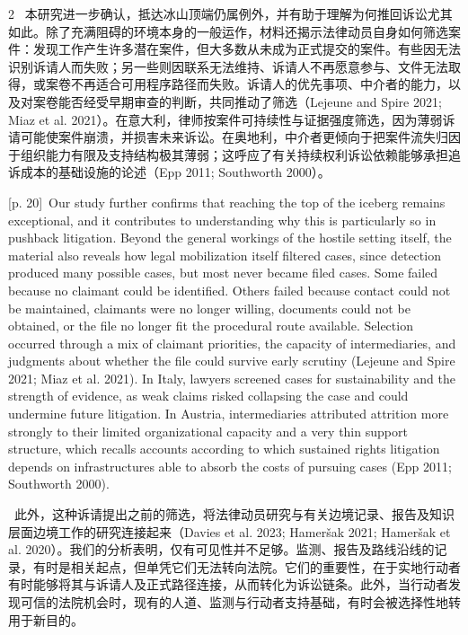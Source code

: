 \documentclass[10pt,a4paper]{article}
\begin{document}
\begin{paracol}{2}
\switchcolumn*
{\scriptsize\color{gray} [p. 20]}\ 本研究进一步确认，抵达冰山顶端仍属例外，并有助于理解为何推回诉讼尤其如此。除了充满阻碍的环境本身的一般运作，材料还揭示法律动员自身如何筛选案件：发现工作产生许多潜在案件，但大多数从未成为正式提交的案件。有些因无法识别诉请人而失败；另一些则因联系无法维持、诉请人不再愿意参与、文件无法取得，或案卷不再适合可用程序路径而失败。诉请人的优先事项、中介者的能力，以及对案卷能否经受早期审查的判断，共同推动了筛选（Lejeune and Spire 2021; Miaz et al. 2021）。在意大利，律师按案件可持续性与证据强度筛选，因为薄弱诉请可能使案件崩溃，并损害未来诉讼。在奥地利，中介者更倾向于把案件流失归因于组织能力有限及支持结构极其薄弱；这呼应了有关持续权利诉讼依赖能够承担追诉成本的基础设施的论述（Epp 2011; Southworth 2000）。\par
\switchcolumn
{\scriptsize\color{gray} [p. 20]}\ Our study further confirms that reaching the top of the iceberg remains exceptional, and it contributes to understanding why this is particularly so in pushback litigation. Beyond the general workings of the hostile setting itself, the material also reveals how legal mobilization itself filtered cases, since detection produced many possible cases, but most never became filed cases. Some failed because no claimant could be identified. Others failed because contact could not be maintained, claimants were no longer willing, documents could not be obtained, or the file no longer fit the procedural route available. Selection occurred through a mix of claimant priorities, the capacity of intermediaries, and judgments about whether the file could survive early scrutiny (Lejeune and Spire 2021; Miaz et al. 2021). In Italy, lawyers screened cases for sustainability and the strength of evidence, as weak claims risked collapsing the case and could undermine future litigation. In Austria, intermediaries attributed attrition more strongly to their limited organizational capacity and a very thin support structure, which recalls accounts according to which sustained rights litigation depends on infrastructures able to absorb the costs of pursuing cases (Epp 2011; Southworth 2000).\par
\switchcolumn*
{\scriptsize\color{gray} [p. 20]}\ 此外，这种诉请提出之前的筛选，将法律动员研究与有关边境记录、报告及知识层面边境工作的研究连接起来（Davies et al. 2023; Hameršak 2021; Hameršak et al. 2020）。我们的分析表明，仅有可见性并不足够。监测、报告及路线沿线的记录，有时是相关起点，但单凭它们无法转向法院。它们的重要性，在于实地行动者有时能够将其与诉请人及正式路径连接，从而转化为诉讼链条。此外，当行动者发现可信的法院机会时，现有的人道、监测与行动者支持基础，有时会被选择性地转用于新目的。\par

\end{paracol}
\end{document}
